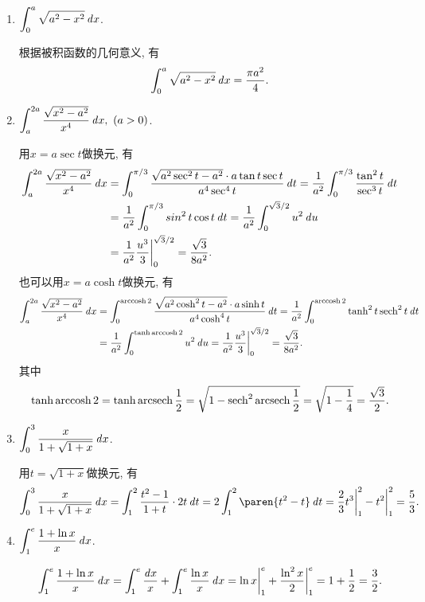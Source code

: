 \begin{enumerate}
\item \(\displaystyle \int_0^a \sqrt{a^2 - x^2} \mathop{}\!\mathit{d} x\).

  \ifshowsol
    根据被积函数的几何意义, 有
    \[
      \int_0^a \sqrt{a^2 - x^2} \mathop{}\!\mathit{d} x = \frac{\pi a^2}{4}.
    \]
  \fi

\item \(\displaystyle \int_a^{2a} \frac{\sqrt{x^2 - a^2}}{x^4} \mathop{}\!\mathit{d} x, \ (a > 0)\).

  \ifshowsol
    用\(x = a \sec t\)做换元, 有
    \[
      \begin{split}
        \int_a^{2a} \frac{\sqrt{x^2 - a^2}}{x^4} \mathop{}\!\mathit{d} x
        &= \int_0^{\pi/3} \frac{\sqrt{a^2 \sec^2 t - a^2} \cdot a \tan t \sec t}{a^4 \sec^4 t} \mathop{}\!\mathit{d} t
          = \frac{1}{a^2} \int_0^{\pi/3} \frac{\tan^2 t}{\sec^3 t} \mathop{}\!\mathit{d} t \\
        &= \frac{1}{a^2} \int_0^{\pi/3} \operatorname{\smash{sin}}^2 t \cos t \mathop{}\!\mathit{d} t
          = \frac{1}{a^2} \int_0^{\sqrt3/2} u^2 \mathop{}\!\mathit{d} u \\
        &= \frac{1}{a^2} \frac{u^3}{3}\bigg\vert_0^{\sqrt3/2}
          = \frac{\sqrt3}{8a^2}.
      \end{split}
    \]
    也可以用\(x = a \cosh t\)做换元, 有
    \[
      \begin{split}
        \int_a^{2a} \frac{\sqrt{x^2 - a^2}}{x^4} \mathop{}\!\mathit{d} x
        &= \int_0^{\operatorname{arccosh}2} \frac{\sqrt{a^2 \cosh^2 t - a^2} \cdot a \sinh t}{a^4 \cosh^4 t} \mathop{}\!\mathit{d} t
          = \frac1{a^2} \int_0^{\operatorname{arccosh}2} \tanh^2 t \operatorname{sech}^2 t \mathop{}\!\mathit{d} t \\
        &= \frac1{a^2} \int_0^{\tanh\operatorname{arccosh}2} u^2 \mathop{}\!\mathit{d} u
          = \frac1{a^2} \frac{u^3}{3} \bigg\vert_0^{\sqrt3/2}
          = \frac{\sqrt3}{8a^2}.
      \end{split}
    \]
    其中
    \[
      \tanh\operatorname{arccosh}2 = \tanh\operatorname{arcsech}\frac12 = \sqrt{1 - \operatorname{sech}^2\operatorname{arcsech}\frac12}
      = \sqrt{1 - \frac14} = \frac{\sqrt3}{2}.
    \]
  \fi

\item \(\displaystyle \int_0^3 \frac{x}{1 + \sqrt{1+x}} \mathop{}\!\mathit{d} x\).

  \ifshowsol
    用\(t = \sqrt{1+x}\)做换元, 有
    \[
      \int_0^3 \frac{x}{1 + \sqrt{1+x}} \dx
      = \int_1^2 \frac{t^2-1}{1+t} \cdot 2t \dt
      = 2 \int_1^2 \paren{t^2 - t} \dt
      = \frac{2}{3} t^3 \bigg\vert_1^2 - t^2 \bigg\vert_1^2
      = \frac53.
    \]
  \fi

\item \(\displaystyle \int_1^e \frac{1 + \ln x}{x} \mathop{}\!\mathit{d} x\).

  \ifshowsol
    \[
      \int_1^e \frac{1 + \ln x}{x} \mathop{}\!\mathit{d} x
      = \int_1^e \frac{\mathop{}\!\mathit{d} x}{x} + \int_1^e \frac{\ln x}{x} \mathop{}\!\mathit{d} x
      = \ln x \bigg\vert_1^e + \frac{\ln^2 x}{2} \bigg\vert_1^e
      = 1 + \frac12 = \frac32.
    \]
  \fi


\end{enumerate}
